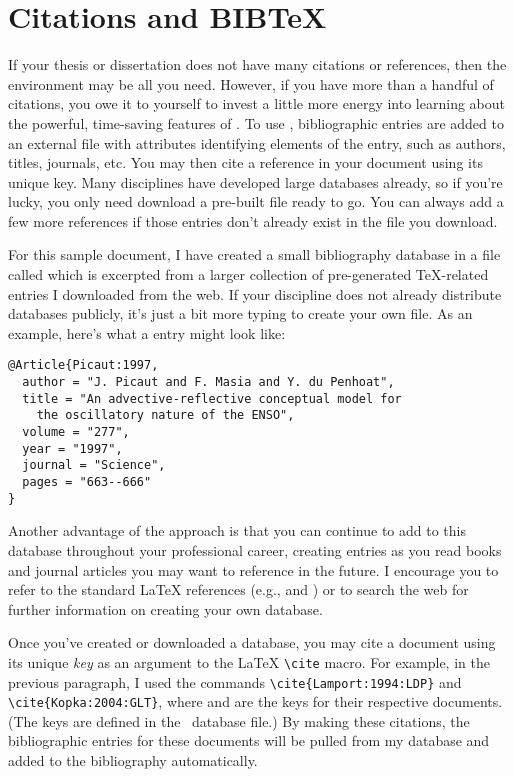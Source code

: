 \section{Citations and B{\small IB}\TeX}
If your thesis or dissertation does not have many citations or
references, then the  environment may be all you
need. However, if you have more than a handful of citations, you owe
it to yourself to invest a little more energy into learning about the
powerful, time-saving features of \BibTeX.  To use \BibTeX,
bibliographic entries are added to an external file with attributes
identifying elements of the entry, such as authors, titles, journals,
etc.  You may then cite a reference in your document using its unique
key.  Many disciplines have developed large \BibTeX{} databases
already, so if you're lucky, you only need download a pre-built file
ready to go.  You can always add a few more references if those
entries don't already exist in the file you download.

For this sample document, I have created a small \BibTeX{}
bibliography database in a file called  which is
excerpted from a larger collection of pre-generated \TeX-related
entries I downloaded from the web.  If your discipline does not
already distribute \BibTeX{} databases publicly, it's just a bit
more typing to create your own \BibTeX{} file.  As an example, here's
what a \BibTeX{} entry might look like:
\begin{verbatim}
@Article{Picaut:1997,                  
  author = "J. Picaut and F. Masia and Y. du Penhoat",
  title = "An advective-reflective conceptual model for
    the oscillatory nature of the ENSO",
  volume = "277",
  year = "1997",
  journal = "Science",
  pages = "663--666"
}
\end{verbatim}

Another advantage of the \BibTeX{} approach is that you can continue
to add to this database throughout your professional career, creating
entries as you read books and journal articles you may want to
reference in the future.  I encourage you to refer to the
standard \LaTeX{} references (e.g., \cite{Lamport:1994:LDP}
and \cite{Kopka:2004:GLT}) or to search the web for further
information on creating your own \BibTeX{} database.

Once you've created or downloaded a \BibTeX{} database, you may cite a
document using its unique \textit{key} as an argument to
the \LaTeX{} \verb|\cite| macro.  For example, in the previous
paragraph, I used the commands \verb|\cite{Lamport:1994:LDP}| and
\verb|\cite{Kopka:2004:GLT}|, where  and
 are the keys for their respective documents.
(The keys are defined in the \BibTeX\ database file.)  By making these
citations, the bibliographic entries for these documents will be
pulled from my \BibTeX{} database and added to the bibliography
automatically.

